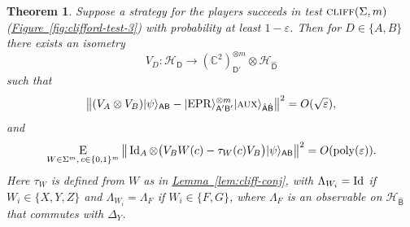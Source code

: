 \documentclass[11pt]{article}
\numberwithin{equation}{section}
\newtheorem{theorem}{Theorem}[section]
\theoremstyle{definition}
\theoremstyle{plain}
\newcommand{\C}{\mathbb C}
\newcommand{\expref}[2]{\hyperref[#2]{#1~\ref{#2}}}
\newcommand{\ket}[1]{|#1\rangle}
\newcommand{\Id}{\ensuremath{\mathop{\rm Id}\nolimits}}
\newcommand{\Es}[1]{\ensuremath{\mathop{\textsc{E}}}_{#1}} %
\DeclareMathOperator{\poly}{poly}
\newcommand{\reg}[1]{{\textsf{#1}}}
\newcommand{\mH}{\mathcal{H}}
\newcommand{\eps}{\varepsilon}
\newcommand{\EPR}{{\rm EPR}}
\newcommand{\aux}{\textsc {aux}}
\newcommand{\cliff}{\textsc{cliff}}
\newcommand{\phase}{\Lambda}
\begin{document}
\newpage  %

\begin{theorem}\label{thm:clifford-ntest}
Suppose a strategy for the players succeeds in test $\cliff(\Sigma,m)$ (\expref{Figure}{fig:clifford-test-3}) with probability at least $1-\eps$. Then  for $D\in\{A,B\}$ there exists an isometry 
$$V_D: \mathcal{H}_\reg{D} \to (\C^2)^{\otimes m}_{\reg{D}'} \otimes {\mH}_{\hat{\reg{D}}}$$
such that 
\begin{equation}\label{eq:psi-epr}
\big\| (V_A \otimes V_B) \ket{\psi}_{\reg{AB}} - \ket{\EPR}_{\reg{A}'\reg{B}'}^{\otimes m} \ket{\aux}_{\hat{\reg{A}}\hat{\reg{B}}} \big\|^2 = O(\sqrt{\eps}),
\end{equation}
and \begin{equation}\label{eq:clifford-ntest-close}
\Es{W\in\Sigma^m,\,c\in\{0,1\}^m} \big\| \Id_A \otimes \big( V_B W(c) - \tau_{W}(c) V_B\big)   \ket{\psi}_{\reg{AB}} \big\|^2 = O(\poly(\eps)).
\end{equation}
Here $\tau_W$ is defined from $W$ as in \expref{Lemma}{lem:cliff-conj}, with $\phase_{W_i} = \Id$ if $W_i\in \{X,Y,Z\}$ and $\phase_{W_i} = \phase_F$ if $W_i\in\{F,G\}$, where $\phase_F$ is an  observable on ${\mH}_{\hat{\reg{B}}}$ that commutes with $\Delta_Y$. 
\end{theorem}
\end{document}
